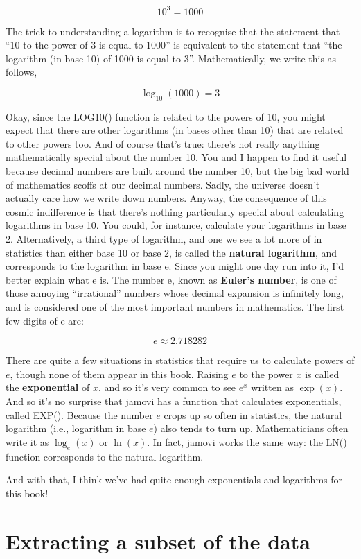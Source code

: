 \documentclass[
  a4paper,
]{book}
\begin{document}
\[10^3=1000\]

The trick to understanding a logarithm is to recognise that the
statement that ``10 to the power of 3 is equal to 1000'' is equivalent
to the statement that ``the logarithm (in base 10) of 1000 is equal to
3''. Mathematically, we write this as follows,

\[\log_{10}(1000)=3\]

Okay, since the LOG10() function is related to the powers of 10, you
might expect that there are other logarithms (in bases other than 10)
that are related to other powers too. And of course that's true: there's
not really anything mathematically special about the number 10. You and
I happen to find it useful because decimal numbers are built around the
number 10, but the big bad world of mathematics scoffs at our decimal
numbers. Sadly, the universe doesn't actually care how we write down
numbers. Anyway, the consequence of this cosmic indifference is that
there's nothing particularly special about calculating logarithms in
base 10. You could, for instance, calculate your logarithms in base 2.
Alternatively, a third type of logarithm, and one we see a lot more of
in statistics than either base 10 or base 2, is called the
\textbf{natural logarithm}, and corresponds to the logarithm in base e.
Since you might one day run into it, I'd better explain what e is. The
number e, known as \textbf{Euler's number}, is one of those annoying
``irrational'' numbers whose decimal expansion is infinitely long, and
is considered one of the most important numbers in mathematics. The
first few digits of e are:

\[e \approx 2.718282 \]

There are quite a few situations in statistics that require us to
calculate powers of \(e\), though none of them appear in this book.
Raising \(e\) to the power \(x\) is called the \textbf{exponential} of
\(x\), and so it's very common to see \(e^x\) written as \(\exp(x)\).
And so it's no surprise that jamovi has a function that calculates
exponentials, called EXP(). Because the number \(e\) crops up so often
in statistics, the natural logarithm (i.e., logarithm in base \(e\))
also tends to turn up. Mathematicians often write it as \(\log_e(x)\) or
\(\ln(x)\). In fact, jamovi works the same way: the LN() function
corresponds to the natural logarithm.

And with that, I think we've had quite enough exponentials and
logarithms for this book!

\hypertarget{extracting-a-subset-of-the-data}{%
\section{Extracting a subset of the
data}\label{extracting-a-subset-of-the-data}}
\end{document}
